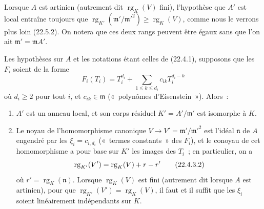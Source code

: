 \begin{remark}[22.4.2]
\label{0.22.4.2-fr}
Lorsque $A$ est artinien (autrement dit $\operatorname{rg}_K(V)$ fini),
l'hypothèse que $A'$ est local entraîne toujours que
$\operatorname{rg}_{K'}(\mathfrak m'/\mathfrak m'^2)
\geqslant\operatorname{rg}_K(V)$, comme nous le verrons plus loin (22.5.2).
On notera que ces deux rangs peuvent être égaux sans que l'on ait
$\mathfrak m'=\mathfrak mA'$.
\end{remark}

\begin{proposition}[22.4.3]
\label{0.22.4.3-fr}
Les hypothèses sur $A$ et les notations étant celles de \textup{(22.4.1)}, supposons
que les $F_i$ soient de la forme
\begin{equation}
\label{0.22.4.3.1-fr}
  F_i(T_i)=T_i^{d_i}+\sum_{1\leqslant k\leqslant d_i}
  c_{ik}T_i^{d_i-k}
  \tag{22.4.3.1}
\end{equation}
où $d_i\geqslant2$ pour tout $i$, et $c_{ik}\in\mathfrak m$
(«~polynômes d'Eisenstein~»). Alors~:
\begin{enumerate}
  \item[\textup{(i)}] $A'$ est un anneau local, et son corps résiduel
  $K'=A'/\mathfrak m'$ est isomorphe à $K$.


  \item[\textup{(ii)}] Le noyau de l'homomorphisme canonique
  $V\to V'=\mathfrak m'/\mathfrak m'^2$ est l'idéal $\mathfrak n$ de $A$
  engendré par les $\xi_i=c_{i,d_i}$ («~termes constants~» des $F_i$), et
  le conoyau de cet homomorphisme a pour base sur $K'$ les images des $T_i$~;
  en particulier, on a
  \begin{equation}
  \label{0.22.4.3.2-fr}
    \operatorname{rg}_{K'}(V')=\operatorname{rg}_K(V)+r- r'
    \tag{22.4.3.2}
  \end{equation}
  où $r'=\operatorname{rg}_K(\mathfrak n)$. Lorsque
  $\operatorname{rg}_K(V)$ est fini (autrement dit lorsque $A$ est
  artinien), pour que
  $\operatorname{rg}_{K'}(V')=\operatorname{rg}_K(V)$, il faut et il suffit
  que les $\xi_i$ soient linéairement indépendants sur $K$.
\end{enumerate}
\end{proposition}

